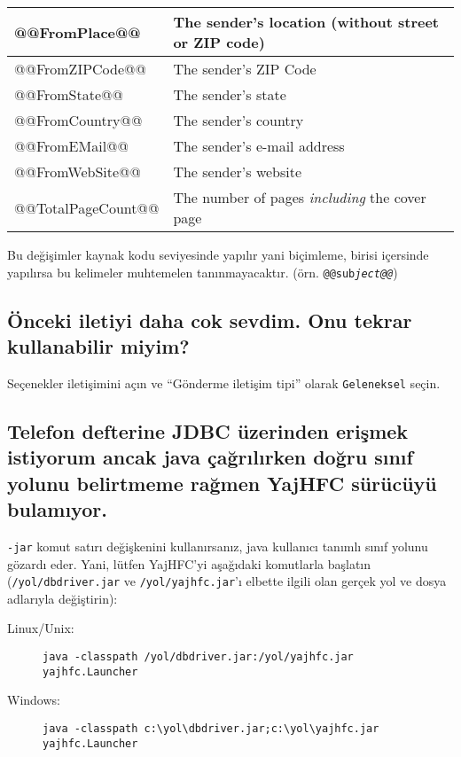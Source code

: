 \documentclass[a4paper,10pt]{scrartcl}
\begin{document}
\begin{center}
\begin{tabular}{|l|p{}|}
\ttfamily @@FromPlace@@ & The sender's  location (without street or ZIP code)\\\hline
\ttfamily @@FromZIPCode@@ & The sender's  ZIP Code \\\hline
\ttfamily @@FromState@@ & The sender's  state\\\hline
\ttfamily @@FromCountry@@ & The sender's  country\\\hline
\ttfamily @@FromEMail@@ & The sender's  e-mail address\\\hline
\ttfamily @@FromWebSite@@ & The sender's website\\\hline
\ttfamily @@TotalPageCount@@ & The number of pages \textit{including} the cover page \\\hline
\end{tabular}
\end{center}

Bu değişimler kaynak kodu seviyesinde yapılır yani biçimleme, birisi içersinde yapılırsa bu kelimeler muhtemelen tanınmayacaktır. (örn. \texttt{@@sub\textit{ject@@}})

\subsection{Önceki iletiyi daha cok sevdim. Onu tekrar kullanabilir miyim?}

Seçenekler iletişimini açın ve ``Gönderme iletişim tipi'' olarak \texttt{Geleneksel} seçin.

\subsection{Telefon defterine JDBC üzerinden erişmek istiyorum ancak java çağrılırken doğru sınıf yolunu belirtmeme rağmen YajHFC sürücüyü bulamıyor.}

\texttt{-jar} komut satırı değişkenini kullanırsanız, java kullanıcı tanımlı sınıf yolunu gözardı eder.
Yani, lütfen YajHFC'yi aşağıdaki komutlarla başlatın (\texttt{/yol/dbdriver.jar} ve \texttt{/yol/yajhfc.jar}'ı elbette ilgili olan gerçek yol ve dosya adlarıyla değiştirin):

\begin{description}
\item [Linux/Unix:] \verb#java -classpath /yol/dbdriver.jar:/yol/yajhfc.jar yajhfc.Launcher#
\item [Windows:] \verb#java -classpath c:\yol\dbdriver.jar;c:\yol\yajhfc.jar yajhfc.Launcher#
\end{description}
\end{document}
